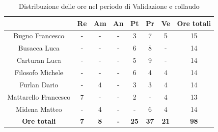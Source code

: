 \begin{table}[H]
  \centering
  \renewcommand{\arraystretch}{1.8}
  \begin{tabular}{c|c|c|c|c|c|c|c}
    \rowcolor[HTML]{125E28}
    \multicolumn{1}{c}{\color[HTML]{FFFFFF}\textbf{ Nominativo }}
                         & \multicolumn{1}{c}{\color[HTML]{FFFFFF}\textbf{ Re }}
                         & \multicolumn{1}{c}{\color[HTML]{FFFFFF}\textbf{ Am}}
                         & \multicolumn{1}{c}{\color[HTML]{FFFFFF}\textbf{ An }}
                         & \multicolumn{1}{c}{\color[HTML]{FFFFFF}\textbf{ Pt }}
                         & \multicolumn{1}{c}{\color[HTML]{FFFFFF}\textbf{ Pr }}
                         & \multicolumn{1}{c}{\color[HTML]{FFFFFF}\textbf{ Ve }}
                         & \multicolumn{1}{c}{\color[HTML]{FFFFFF}\textbf{ Ore totali }}                                                                                   \\
    \hline
    Bugno Francesco      & -                                                             & -          & -          & 3           & 7           & 5           & 15          \\
    Busacca Luca         & -                                                             & -          & -          & 6           & 8           & -           & 14          \\
    Carturan Luca        & -                                                             & -          & -          & 5           & 9           & -           & 14          \\
    Filosofo Michele     & -                                                             & -          & -          & 6           & 4           & 4           & 14          \\
    Furlan Dario         & -                                                             & 4          & -          & 3           & 3           & 4           & 14          \\
    Mattarello Francesco & 7                                                             & -          & -          & 2           & -           & 4           & 13          \\
    Midena Matteo        & -                                                             & 4          & -          & -           & 6           & 4           & 14          \\
    \textbf{Ore totali}  & \textbf{7}                                                    & \textbf{8} & \textbf{-} & \textbf{25} & \textbf{37} & \textbf{21} & \textbf{98}
  \end{tabular}
  \caption{Distribuzione delle ore nel periodo di Validazione e collaudo}
\end{table}


